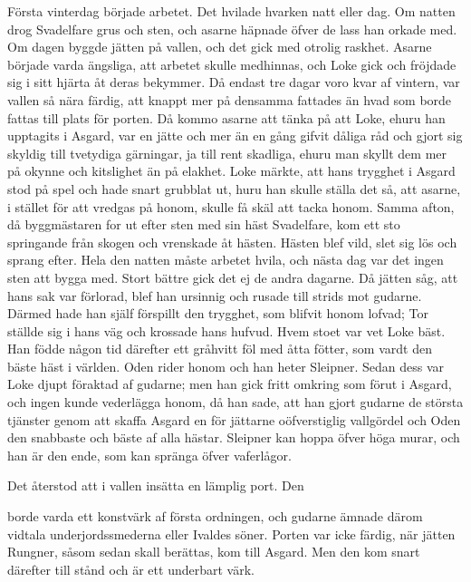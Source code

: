 Första vinterdag började arbetet. Det hvilade hvarken
natt eller dag. Om natten drog Svadelfare grus och sten, och asarne
häpnade öfver de lass han orkade med. Om dagen byggde jätten på vallen,
och det gick med otrolig raskhet. Asarne började varda ängsliga, att
arbetet skulle medhinnas, och Loke gick och fröjdade sig i sitt hjärta
åt deras bekymmer. Då endast tre dagar voro kvar af vintern, var vallen
så nära färdig, att knappt mer på densamma fattades än hvad som borde
fattas till plats för porten. Då kommo asarne att tänka på att Loke,
ehuru han upptagits i Asgard, var en jätte och mer än en gång gifvit
dåliga råd och gjort sig skyldig till tvetydiga gärningar, ja till rent
skadliga, ehuru man skyllt dem mer på okynne och kitslighet än på
elakhet. Loke märkte, att hans trygghet i Asgard stod på spel och hade
snart grubblat ut, huru han skulle ställa det så, att asarne, i stället
för att vredgas på honom, skulle få skäl att tacka honom. Samma afton,
då byggmästaren for ut efter sten med sin häst Svadelfare, kom ett sto
springande från skogen och vrenskade åt hästen. Hästen blef vild, slet
sig lös och sprang efter. Hela den natten måste arbetet hvila, och nästa
dag var det ingen sten att bygga med. Stort bättre gick det ej de andra
dagarne. Då jätten såg, att hans sak var förlorad, blef han ursinnig och
rusade till strids mot gudarne. Därmed hade han själf förspillt den
trygghet, som blifvit honom lofvad; Tor ställde sig i hans väg och
krossade hans hufvud. Hvem stoet var vet Loke bäst. Han födde någon tid
därefter ett gråhvitt föl med åtta fötter, som vardt den bäste häst i
världen. Oden rider honom och han heter Sleipner. Sedan dess var Loke
djupt föraktad af gudarne; men han gick fritt omkring som förut i
Asgard, och ingen kunde vederlägga honom, då han sade, att han gjort
gudarne de största tjänster genom att skaffa Asgard en för jättarne
oöfverstiglig vallgördel och Oden den snabbaste och bäste af alla
hästar. Sleipner kan hoppa öfver höga murar, och han är den ende, som
kan spränga öfver vaferlågor.

Det återstod att i vallen insätta en lämplig port. Den

borde varda ett konstvärk af första ordningen, och gudarne ämnade därom
vidtala underjordssmederna eller Ivaldes söner. Porten var icke färdig,
när jätten Rungner, såsom sedan skall berättas, kom till Asgard. Men den
kom snart därefter till stånd och är ett underbart värk.

\endSecII


